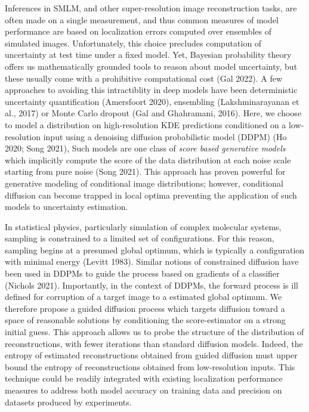 \documentclass{article}
\begin{document}
Inferences in SMLM, and other super-resolution image reconstruction tasks, are often made on a single measurement, and thus common measures of model performance are based on localization errors computed over ensembles of simulated images. Unfortunately, this choice precludes computation of uncertainty at test time under a fixed model. Yet, Bayesian probability theory offers us mathematically grounded tools to reason about model uncertainty, but these usually come with a prohibitive computational cost (Gal 2022). A few approaches to avoiding this intractiblity in deep models have been deterministic uncertainty quantification (Amersfoort 2020), ensembling (Lakshminarayanan et al., 2017) or Monte Carlo dropout (Gal and Ghahramani, 2016). Here, we choose to model a distribution on high-resolution KDE predictions conditioned on a low-resolution input using a denoising diffusion probabilistic model (DDPM) (Ho 2020; Song 2021), Such models are one class of \emph{score based generative models} which implicitly compute the score of the data distribution at each noise scale starting from pure noise (Song 2021). This approach has proven powerful for generative modeling of conditional image distributions; however, conditional diffusion can become trapped in local optima preventing the application of such models to uncertainty estimation.

In statistical physics, particularly simulation of complex molecular systems, sampling is constrained to a limited set of configurations. For this reason, sampling begins at a presumed global optimum, which is typically a configuration with minimal energy (Levitt 1983). Similar notions of constrained diffusion have been used in DDPMs to guide the process based on gradients of a classifier (Nichols 2021). Importantly, in the context of DDPMs, the forward process is ill defined for corruption of a target image to a estimated global optimum. We therefore propose a guided diffusion process which targets diffusion toward a space of reasonable solutions by conditioning the score-estimator on a strong initial guess. This approach allows us to probe the structure of the distribution of reconstructions, with fewer iterations than standard diffusion models. Indeed, the entropy of estimated reconstructions obtained from guided diffusion must upper bound the entropy of reconstructions obtained from low-resolution inputs. This technique could be readily integrated with existing localization performance measures to address both model accuracy on training data and precision on datasets produced by experiments. 
\end{document}
